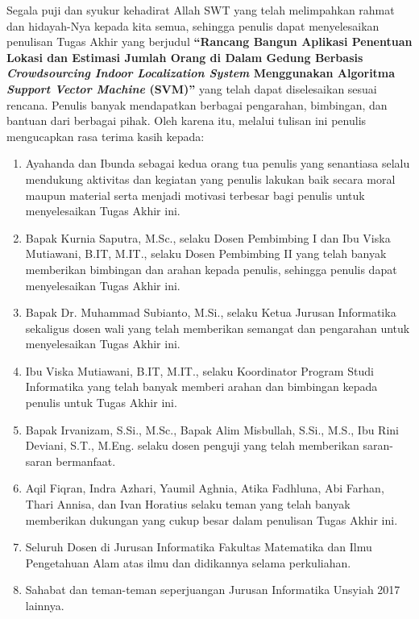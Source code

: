 \preface %


Segala puji dan syukur kehadirat Allah SWT yang telah melimpahkan rahmat dan hidayah-Nya kepada kita semua, sehingga penulis dapat menyelesaikan penulisan Tugas Akhir yang berjudul \textbf{“Rancang Bangun Aplikasi Penentuan Lokasi dan Estimasi Jumlah Orang di Dalam Gedung Berbasis \textit{Crowdsourcing Indoor Localization System} Menggunakan Algoritma \textit{Support Vector Machine} (SVM)”} yang telah dapat diselesaikan sesuai rencana. Penulis banyak mendapatkan berbagai pengarahan, bimbingan, dan bantuan dari berbagai pihak. Oleh karena itu, melalui tulisan ini penulis mengucapkan rasa terima kasih kepada:

\begin{enumerate}
	\item{Ayahanda dan Ibunda sebagai kedua orang tua penulis yang senantiasa selalu mendukung aktivitas dan kegiatan yang penulis lakukan baik secara moral maupun material serta menjadi motivasi terbesar bagi penulis untuk menyelesaikan Tugas Akhir ini.}
	\item{Bapak Kurnia Saputra, M.Sc., selaku Dosen Pembimbing I dan Ibu Viska Mutiawani, B.IT, M.IT., selaku Dosen Pembimbing II yang telah banyak memberikan bimbingan dan arahan kepada penulis, sehingga penulis dapat menyelesaikan Tugas Akhir ini.}
	\item {Bapak Dr. Muhammad Subianto, M.Si., selaku Ketua Jurusan Informatika sekaligus dosen wali yang telah memberikan semangat dan pengarahan untuk menyelesaikan Tugas Akhir ini.}
	\item {Ibu Viska Mutiawani, B.IT, M.IT., selaku Koordinator Program Studi Informatika yang telah banyak memberi arahan dan bimbingan kepada penulis untuk Tugas Akhir ini.}
	\item {Bapak Irvanizam, S.Si., M.Sc., Bapak Alim Misbullah, S.Si., M.S., Ibu Rini Deviani, S.T., M.Eng. selaku dosen penguji yang telah memberikan saran-saran bermanfaat.}
	\item {Aqil Fiqran, Indra Azhari, Yaumil Aghnia, Atika Fadhluna, Abi Farhan, Thari Annisa, dan Ivan Horatius selaku teman yang telah banyak memberikan dukungan yang cukup besar dalam penulisan Tugas Akhir ini.}
	      \item{Seluruh Dosen di Jurusan Informatika Fakultas Matematika dan Ilmu Pengetahuan Alam atas ilmu dan didikannya selama perkuliahan.}
	      \item{Sahabat dan teman-teman seperjuangan Jurusan Informatika Unsyiah 2017 lainnya.}
\end{enumerate}


